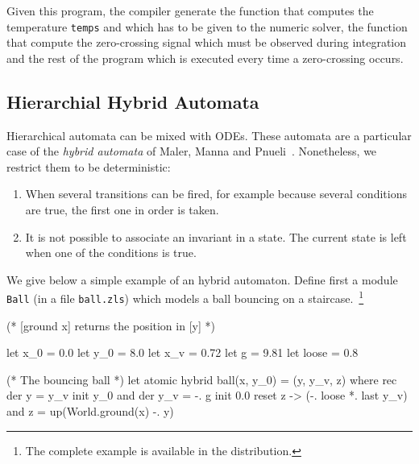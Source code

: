 \documentclass[11pt,titlepage,twoside]{report}
\begin{document}
Given this program, the compiler generate the function that computes
the temperature \verb-temps- and which has to be given to the numeric solver,
the function that compute the zero-crossing signal which must be observed
during integration and the rest of the program which is executed every time
a zero-crossing occurs.



\subsection{Hierarchial Hybrid Automata}
Hierarchical automata can be mixed with ODEs. These automata are a
particular case of the \emph{hybrid automata} of Maler, Manna and
Pnueli~\cite{MalerMannaPnueli:hybrid92}. Nonetheless, we restrict them
to be deterministic:
\begin{enumerate}
  \item When several transitions can be fired, for
    example because several conditions are true, the first one in order is
    taken.
  \item It is not possible to associate an invariant in a state. The current
    state is left when one of the conditions is true.
\end{enumerate}

We give below a simple example of an hybrid automaton. Define first
a module \texttt{Ball} (in a file \texttt{ball.zls}) which models a ball bouncing
on a staircase.~\footnote{The complete example is available in the distribution.}

\begin{runverbatim}[withresult]
(* [ground x] returns the position in [y] *)

let x_0 = 0.0
let y_0 = 8.0
let x_v = 0.72
let g = 9.81
let loose = 0.8

(* The bouncing ball *)
let atomic hybrid ball(x, y_0) = (y, y_v, z) where
  rec der y = y_v init y_0
  and der y_v = -. g init 0.0 reset z -> (-. loose *. last y_v)
  and z = up(World.ground(x) -. y)
\end{runverbatim}
\end{document}
